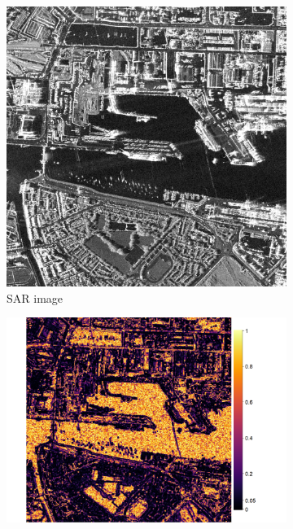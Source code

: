 \documentclass[
  journal,
]{IEEEtran}%
\begin{document}
\begin{figure}[hbt]
    \centering
    \begin{subfigure}{0.16\textwidth}
        \includegraphics[width=\linewidth]{./Figures/dublin_1100_hh.png}
        \caption{SAR image}
        \label{fig:3a}
    \end{subfigure}
    \begin{subfigure}{0.22\textwidth}
        \includegraphics[width=\linewidth]{./Figures/dublin_renyi_09_w7_b100.png}

\end{subfigure}
\end{figure}
\end{document}
